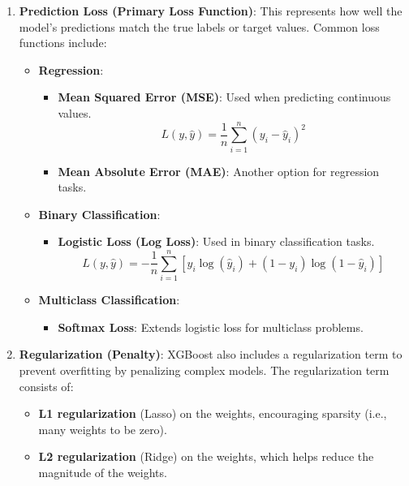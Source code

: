 \documentclass[12pt]{book}
\providecommand{\tightlist}{%
  \setlength{\itemsep}{0pt}\setlength{\parskip}{0pt}}
\begin{document}
\begin{enumerate}
\def\labelenumi{\arabic{enumi}.}
\tightlist
\item
  \textbf{Prediction Loss (Primary Loss Function)}: This represents how
  well the model's predictions match the true labels or target values.
  Common loss functions include:

  \begin{itemize}
  \tightlist
  \item
    \textbf{Regression}:

    \begin{itemize}
    \tightlist
    \item
      \textbf{Mean Squared Error (MSE)}: Used when predicting continuous
      values. \[
      L(y, \hat{y}) = \frac{1}{n} \sum_{i=1}^{n} (y_i - \hat{y}_i)^2
      \]
    \item
      \textbf{Mean Absolute Error (MAE)}: Another option for regression
      tasks.
    \end{itemize}
  \item
    \textbf{Binary Classification}:

    \begin{itemize}
    \tightlist
    \item
      \textbf{Logistic Loss (Log Loss)}: Used in binary classification
      tasks. \[
      L(y, \hat{y}) = -\frac{1}{n} \sum_{i=1}^{n} \left[ y_i \log (\hat{y}_i) + (1 - y_i) \log (1 - \hat{y}_i) \right]
      \]
    \end{itemize}
  \item
    \textbf{Multiclass Classification}:

    \begin{itemize}
    \tightlist
    \item
      \textbf{Softmax Loss}: Extends logistic loss for multiclass
      problems.
    \end{itemize}
  \end{itemize}
\item
  \textbf{Regularization (Penalty)}: XGBoost also includes a
  regularization term to prevent overfitting by penalizing complex
  models. The regularization term consists of:

  \begin{itemize}
  \tightlist
  \item
    \textbf{L1 regularization} (Lasso) on the weights, encouraging
    sparsity (i.e., many weights to be zero).
  \item
    \textbf{L2 regularization} (Ridge) on the weights, which helps
    reduce the magnitude of the weights.
  \end{itemize}
\end{enumerate}
\end{document}
